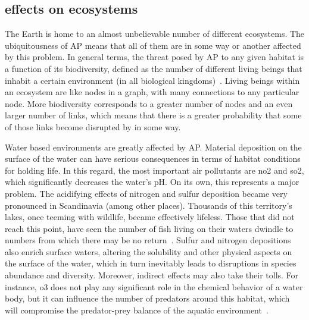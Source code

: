 \subsection{ effects on ecosystems}%
\label{sub:ap_effects_on_ecosystems}
The Earth is home to an almost unbelievable number of different
ecosystems. The ubiquitousness of \gls{AP} means that all of them are in
some way or another affected by this problem. In general terms, the
threat posed by \gls{AP} to any given habitat is a function of its
biodiversity, defined as the number of different living beings that
inhabit a certain environment (in all biological
kingdoms)~\cite{OxfordPress2020}. Living beings within an ecosystem are
like nodes in a graph, with many connections to any particular node.
More biodiversity corresponds to a greater number of nodes and an even
larger number of links,  which means that there is a greater probability
that some of those links become disrupted by  in some way.

Water based environments are greatly affected by \gls{AP}. Material
deposition on the surface of the water can have serious consequences in
terms of habitat conditions for holding life. In this regard, the most
important air pollutants are \gls{no2} and \gls{so2},  which
significantly decreases the water's pH. On its own, this represents a
major problem. The acidifying effects of nitrogen and sulfur deposition
became very pronounced in Scandinavia (among other places). Thousands of
this territory's lakes, once teeming with wildlife, became effectively
lifeless. Those that did not reach this point, have seen the number of
fish living on their waters dwindle to numbers from which there may be
no return~\cite{DeWit2015}. Sulfur and nitrogen depositions also enrich
surface waters, altering the solubility and other physical aspects on
the surface of the water, which in turn inevitably leads to disruptions
in species abundance and diversity. Moreover, indirect effects may also
take their tolls. For instance, \gls{o3} does not play any significant
role in the chemical behavior of a water body, but it can influence the
number of predators around this habitat, which will compromise the
predator-prey balance of the aquatic environment~\cite{Vallero2014,
Lovett2009}.

